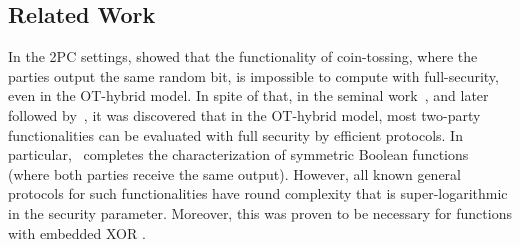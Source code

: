 \documentclass{llncs}
\newcommand{\Y}{\mathcal{Y}}
\renewcommand{\v}{\myvec{v}}
\newcommand{\Out}{\operatorname{Out}}
\begin{document}
\subsection{Related Work}
In the 2PC settings, \citet{Cleve86} showed that the functionality of coin-tossing, where the parties output the same random bit, is impossible to compute with full-security, even in the OT-hybrid model. In spite of that, in the seminal work~\citet{GHKL08}, and later followed by~\cite{Ash14,makriyannis2014classification,daza2017designingfull,asharov2015complete}, it was discovered that in the OT-hybrid model, most two-party functionalities can be evaluated with full security by efficient protocols. In particular,~\cite{asharov2015complete} completes the characterization of symmetric Boolean functions (where both parties receive the same output). However, all known general protocols for such functionalities have round complexity that is super-logarithmic in the security parameter. Moreover, this was proven to be necessary for functions with embedded XOR \cite{GHKL08}.
\end{document}
